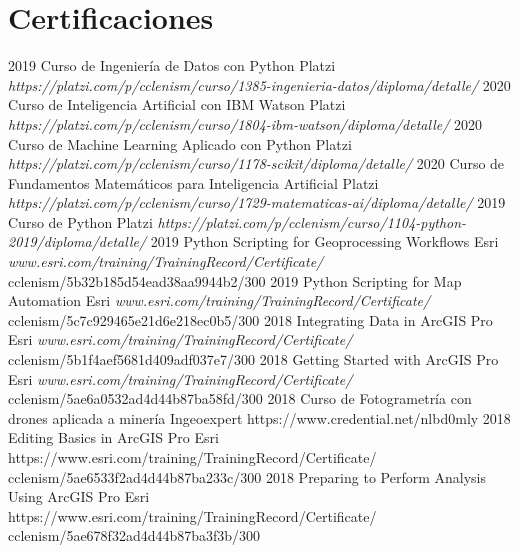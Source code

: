 \documentclass[]{friggeri-cv}
\begin{document}
\newpage

\section{Certificaciones}
\begin{entrylist}

  \entry
   {2019}
    {Curso de Ingeniería de Datos con Python}
    {Platzi}
    {\emph{https://platzi.com/p/cclenism/curso/1385-ingenieria-datos/diploma/detalle/}}
     \entry
  {2020}
    {Curso de Inteligencia Artificial con IBM Watson}
    {Platzi}
    {\emph{https://platzi.com/p/cclenism/curso/1804-ibm-watson/diploma/detalle/}}
     \entry
   {2020}
    {Curso de Machine Learning Aplicado con Python}
    {Platzi}
    {\emph{https://platzi.com/p/cclenism/curso/1178-scikit/diploma/detalle/}}
     \entry
    {2020}
    {Curso de Fundamentos Matemáticos para Inteligencia Artificial}
    {Platzi}
    {\emph{https://platzi.com/p/cclenism/curso/1729-matematicas-ai/diploma/detalle/}}
     \entry
    {2019}
    {Curso de Python}
    {Platzi}
    {\emph{https://platzi.com/p/cclenism/curso/1104-python-2019/diploma/detalle/}}
     \entry
    {2019}
    {Python Scripting for Geoprocessing Workflows}
    {Esri}
    {\emph{www.esri.com/training/TrainingRecord/Certificate/}\\{cclenism/5b32b185d54ead38aa9944b2/300}}
    \entry
    {2019}
    {Python Scripting for Map Automation}
    {Esri}
    {\emph{www.esri.com/training/TrainingRecord/Certificate/}\\{cclenism/5c7c929465e21d6e218ec0b5/300}}
    \entry
    {2018}
    {Integrating Data in ArcGIS Pro}
    {Esri}
    {\emph{www.esri.com/training/TrainingRecord/Certificate/}\\{cclenism/5b1f4aef5681d409adf037e7/300}}
    \entry
    {2018}
    {Getting Started with ArcGIS Pro}
    {Esri}
    {\emph{www.esri.com/training/TrainingRecord/Certificate/}\\{cclenism/5ae6a0532ad4d44b87ba58fd/300}}
    \entry
    {2018}
    {Curso de Fotogrametría con drones aplicada a minería}
    {Ingeoexpert}
    {https://www.credential.net/nlbd0mly}
    \entry
    {2018}
    {Editing Basics in ArcGIS Pro}
    {Esri}
    {{https://www.esri.com/training/TrainingRecord/Certificate/}\\{cclenism/5ae6533f2ad4d44b87ba233c/300}}
    \entry
    {2018}
    {Preparing to Perform Analysis Using ArcGIS Pro}
    {Esri}
    {{https://www.esri.com/training/TrainingRecord/Certificate/}\\{cclenism/5ae678f32ad4d44b87ba3f3b/300}}


\end{entrylist}
\end{document}
